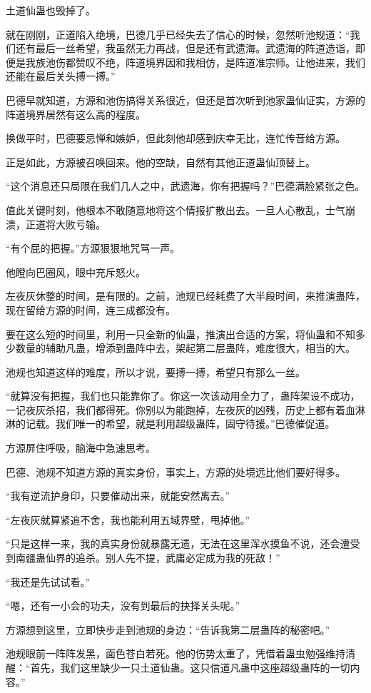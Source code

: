 \begin{this_body}
土道仙蛊也毁掉了。

就在刚刚，正道陷入绝境，巴德几乎已经失去了信心的时候，忽然听池规道：“我们还有最后一丝希望，我虽然无力再战，但是还有武遗海。武遗海的阵道造诣，即便是我族池伤都赞叹不绝，阵道境界因和我相仿，是阵道准宗师。让他进来，我们还能在最后关头搏一搏。”

巴德早就知道，方源和池伤搞得关系很近，但还是首次听到池家蛊仙证实，方源的阵道境界居然有这么高的程度。

换做平时，巴德要忌惮和嫉妒，但此刻他却感到庆幸无比，连忙传音给方源。

正是如此，方源被召唤回来。他的空缺，自然有其他正道蛊仙顶替上。

“这个消息还只局限在我们几人之中，武遗海，你有把握吗？”巴德满脸紧张之色。

值此关键时刻，他根本不敢随意地将这个情报扩散出去。一旦人心散乱，士气崩溃，正道将大败亏输。

“有个屁的把握。”方源狠狠地咒骂一声。

他瞪向巴圈风，眼中充斥怒火。

左夜灰休整的时间，是有限的。之前，池规已经耗费了大半段时间，来推演蛊阵，现在留给方源的时间，连三成都没有。

要在这么短的时间里，利用一只全新的仙蛊，推演出合适的方案，将仙蛊和不知多少数量的辅助凡蛊，增添到蛊阵中去，架起第二层蛊阵，难度很大，相当的大。

池规也知道这样的难度，所以才说，要搏一搏，希望只有那么一丝。

“就算没有把握，我们也只能靠你了。你这一次该动用全力了，蛊阵架设不成功，一记夜灰杀招，我们都得死。你别以为能跑掉，左夜灰的凶残，历史上都有着血淋淋的记载。我们唯一的希望，就是利用超级蛊阵，固守待援。”巴德催促道。

方源屏住呼吸，脑海中急速思考。

巴德、池规不知道方源的真实身份，事实上，方源的处境远比他们要好得多。

“我有逆流护身印，只要催动出来，就能安然离去。”

“左夜灰就算紧追不舍，我也能利用五域界壁，甩掉他。”

“只是这样一来，我的真实身份就暴露无遗，无法在这里浑水摸鱼不说，还会遭受到南疆蛊仙界的追杀。别人先不提，武庸必定成为我的死敌！”

“我还是先试试看。”

“嗯，还有一小会的功夫，没有到最后的抉择关头呢。”

方源想到这里，立即快步走到池规的身边：“告诉我第二层蛊阵的秘密吧。”

池规眼前一阵阵发黑，面色苍白若死。他的伤势太重了，凭借着蛊虫勉强维持清醒：“首先，我们这里缺少一只土道仙蛊。这只信道凡蛊中这座超级蛊阵的一切内容。”


\end{this_body}
